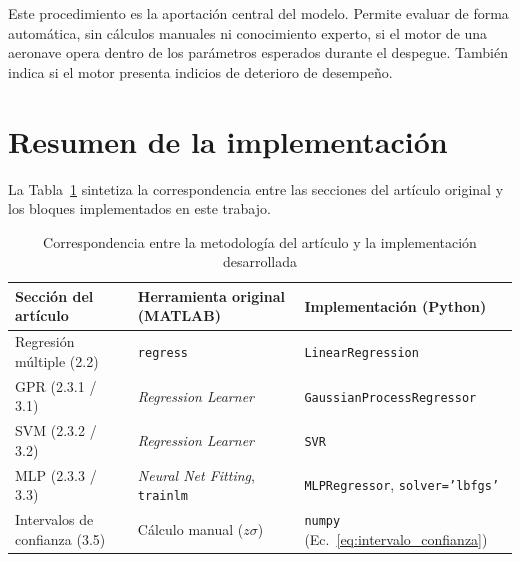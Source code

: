 Este procedimiento es la aportación central del modelo. Permite evaluar de forma automática, sin cálculos manuales ni conocimiento experto, si el motor de una aeronave opera dentro de los parámetros esperados durante el despegue. También indica si el motor presenta indicios de deterioro de desempeño.

\section{Resumen de la implementación}

La Tabla~\ref{tab:resumen_implementacion} sintetiza la correspondencia entre las secciones del artículo original y los bloques implementados en este trabajo.

\begin{table}[H]
\centering
\footnotesize
\renewcommand{\arraystretch}{1.15}
\caption{Correspondencia entre la metodología del artículo y la implementación desarrollada}
\label{tab:resumen_implementacion}
\begin{tabular}{@{}>{\raggedright\arraybackslash}p{3.4cm}>{\raggedright\arraybackslash}p{4.0cm}>{\raggedright\arraybackslash}p{6.2cm}@{}}
\toprule
\textbf{Sección del artículo} & \textbf{Herramienta original (MATLAB)} & \textbf{Implementación (Python)} \\
\midrule
Regresión múltiple (2.2)     & \texttt{regress}                    & \texttt{LinearRegression} \\
GPR (2.3.1 / 3.1)            & \textit{Regression Learner}          & \texttt{GaussianProcessRegressor} \\
SVM (2.3.2 / 3.2)            & \textit{Regression Learner}          & \texttt{SVR} \\
MLP (2.3.3 / 3.3)            & \textit{Neural Net Fitting}, \texttt{trainlm} & \texttt{MLPRegressor}, \texttt{solver='lbfgs'} \\
Intervalos de confianza (3.5) & Cálculo manual ($z\sigma$)          & \texttt{numpy} (Ec.~\ref{eq:intervalo_confianza}) \\
\bottomrule
\end{tabular}
\end{table}
